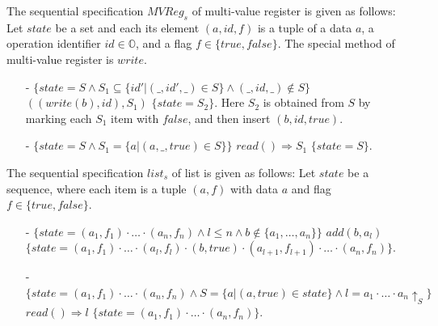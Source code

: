 \begin{example}
\label{definition:sequential specification of multi-value register}
The sequential specification $\mathit{MVReg}_s$ of multi-value register is given as follows: Let $\mathit{state}$ be a set and each its element $(a,\mathit{id},f)$ is a tuple of a data $a$, a operation identifier $\mathit{id} \in \mathbb{O}$, and a flag $f \in \{ \mathit{true},\mathit{false} \}$. The special method of multi-value register is $\mathit{write}$.
\begin{itemize}
\setlength{\itemsep}{0.5pt}
\item[-] $\{ \mathit{state} = S \wedge S_1 \subseteq \{\mathit{id}' \vert (\_,\mathit{id}',\_) \in S\} \wedge (\_,\mathit{id},\_) \notin S \}$ $((write(b),id),S_1)$ $\{ \mathit{state} = S_2 \}$. Here $S_2$ is obtained from $S$ by marking each $S_1$ item with $\mathit{false}$, and then insert $(b,id,\mathit{true})$.
\item[-] $\{ \mathit{state} = S \wedge S_1 = \{ a \vert (a,\_,\mathit{true}) \in S \} \}$ $read() \Rightarrow S_1$ $\{ \mathit{state} = S \}$.
\end{itemize}
\end{example}


\begin{example}
\label{definition:sequential specification of list with add-after interface}
The sequential specification $\mathit{list}_s$ of list is given as follows: Let $\mathit{state}$ be a sequence, where each item is a tuple $(a,f)$ with data $a$ and flag $f \in \{ \mathit{true},\mathit{false} \}$.
\begin{itemize}
\setlength{\itemsep}{0.5pt}
\item[-] $\{ \mathit{state} = (a_1,f_1) \cdot \ldots \cdot (a_n,f_n) \wedge l \leq n \wedge b \notin \{ a_1, \ldots, a_n \} \}$ $add(b,a_l)$ $\{ \mathit{state} = (a_1,f_1) \cdot \ldots \cdot (a_l,f_l) \cdot (b,\mathit{true}) \cdot (a_{l+1},f_{l+1}) \cdot \ldots \cdot (a_n,f_n) \}$.
\item[-] $\{ \mathit{state} = (a_1,f_1) \cdot \ldots \cdot (a_n,f_n) \wedge S = \{ a \vert (a,\mathit{true}) \in \mathit{state} \} \wedge l = a_1 \cdot \ldots \cdot a_n \uparrow_{S} \}$ $read() \Rightarrow l$ $\{ \mathit{state} = (a_1,f_1) \cdot \ldots \cdot (a_n,f_n) \}$.
\end{itemize}
\end{example}


